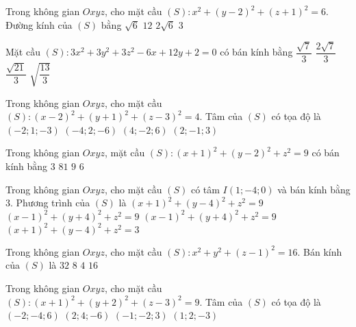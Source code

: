 \begin{ex}%
	Trong không gian $Oxyz$, cho mặt cầu $(S)\colon x^2+(y-2)^2+(z+1)^2=6$. Đường kính của $(S)$ bằng
	\choice
	{$\sqrt{6}$}
	{$12$}
	{\True $2\sqrt{6}$}
	{$3$}
\end{ex}

\begin{ex}%
	Mặt cầu $(S)\colon3x^2+3y^2+3z^2-6x+12y+2=0$ có bán kính bằng
	\choice
	{$\dfrac{\sqrt{7}}{3}$}
	{$\dfrac{2\sqrt{7}}{3}$}
	{$\dfrac{\sqrt{21}}{3}$}
	{\True $\sqrt{\dfrac{13}{3}}$}
\end{ex}

\begin{ex}%
	Trong không gian $Oxyz$, cho mặt cầu $(S)\colon(x-2)^2+(y+1)^2+(z-3)^2=4$. Tâm của $(S)$ có tọa độ là
	\choice
	{$(-2;1;-3)$}
	{$(-4;2;-6)$}
	{$(4;-2;6)$}
	{\True $(2;-1;3)$}
\end{ex}

\begin{ex}%
	Trong không gian $Oxyz$, mặt cầu $(S)\colon (x+1)^2+(y-2)^2+z^2=9$ có bán kính bằng
	\choice
	{\True $3$}
	{$81$}
	{$9$}
	{$6$}
\end{ex}
	
\begin{ex}%
	Trong không gian $Oxyz$, cho mặt cầu $(S)$ có tâm $I(1;-4;0)$ và bán kính bằng $3$. Phương trình của $(S)$ là
	\choice
	{$(x+1)^2+(y-4)^2+z^2=9$}
	{$(x-1)^2+(y+4)^2+z^2=9$}
	{\True $(x-1)^2+(y+4)^2+z^2=9$}
	{$(x+1)^2+(y-4)^2+z^2=3$}
\end{ex}	
	
\begin{ex}%
	Trong không gian $Oxyz$, cho mặt cầu $(S)\colon x^2+y^2+(z-1)^2=16$. Bán kính của $(S)$ là
	\choice
	{$32$}
	{$8$}
	{$4$}
	{$16$}
\end{ex}	
	
\begin{ex}%
	Trong không gian $Oxyz$, cho mặt cầu $(S)\colon (x+1)^2+(y+2)^2+(z-3)^2=9$. Tâm của $(S)$ có tọa độ là
	\choice
	{$(-2;-4;6)$}
	{$(2;4;-6)$}
	{\True $(-1;-2;3)$}
	{$(1;2;-3)$}
\end{ex}
	
